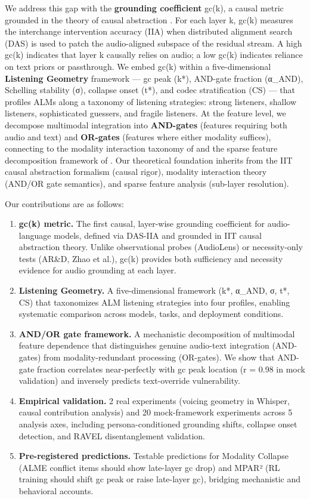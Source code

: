 \documentclass[a4paper]{article}
\begin{document}
We address this gap with the \textbf{grounding coefficient} gc(k), a causal metric grounded in the theory of causal abstraction \cite{geiger2301}. For each layer k, gc(k) measures the interchange intervention accuracy (IIA) when distributed alignment search (DAS) \cite{geiger2303} is used to patch the audio-aligned subspace of the residual stream. A high gc(k) indicates that layer k causally relies on audio; a low gc(k) indicates reliance on text priors or passthrough. We embed gc(k) within a five-dimensional \textbf{Listening Geometry} framework — gc peak (k*), AND-gate fraction (α\_AND), Schelling stability (σ), collapse onset (t*), and codec stratification (CS) — that profiles ALMs along a taxonomy of listening strategies: strong listeners, shallow listeners, sophisticated guessers, and fragile listeners. At the feature level, we decompose multimodal integration into \textbf{AND-gates} (features requiring both audio and text) and \textbf{OR-gates} (features where either modality suffices), connecting to the modality interaction taxonomy of \cite{sutter} and the sparse feature decomposition framework of \cite{asiaee2602}. Our theoretical foundation inherits from the IIT causal abstraction formalism (causal rigor), modality interaction theory (AND/OR gate semantics), and sparse feature analysis (sub-layer resolution).

Our contributions are as follows:

\begin{enumerate}
\item \textbf{gc(k) metric.} The first causal, layer-wise grounding coefficient for audio-language models, defined via DAS-IIA and grounded in IIT causal abstraction theory. Unlike observational probes (AudioLens) or necessity-only tests (AR\&D, Zhao et al.), gc(k) provides both sufficiency and necessity evidence for audio grounding at each layer.
\item \textbf{Listening Geometry.} A five-dimensional framework (k*, α\_AND, σ, t*, CS) that taxonomizes ALM listening strategies into four profiles, enabling systematic comparison across models, tasks, and deployment conditions.
\item \textbf{AND/OR gate framework.} A mechanistic decomposition of multimodal feature dependence that distinguishes genuine audio-text integration (AND-gates) from modality-redundant processing (OR-gates). We show that AND-gate fraction correlates near-perfectly with gc peak location (r = 0.98 in mock validation) and inversely predicts text-override vulnerability.
\item \textbf{Empirical validation.} 2 real experiments (voicing geometry in Whisper, causal contribution analysis) and 20 mock-framework experiments across 5 analysis axes, including persona-conditioned grounding shifts, collapse onset detection, and RAVEL disentanglement validation.
\item \textbf{Pre-registered predictions.} Testable predictions for Modality Collapse (ALME conflict items should show late-layer gc drop) and MPAR² (RL training should shift gc peak or raise late-layer gc), bridging mechanistic and behavioral accounts.
\end{enumerate}
\end{document}
